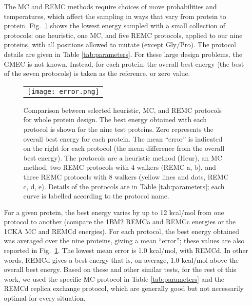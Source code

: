 {{The MC and REMC methods require choices of move probabilities and temperatures, which affect the sampling in ways
that vary from protein to protein. Fig.\ \ref{fig:protocols} shows the lowest energy sampled with a small
collection of protocols: one heuristic, one MC, and five REMC protocols, applied to our nine proteins, with all
positions allowed to mutate (except Gly/Pro). The protocol details are given in Table \ref{tab:parameters}. For
these large design problems, the GMEC is not known. Instead, for each protein, the overall best energy (the best
of the seven protocols) is taken as the reference, or zero value.


    \begin{figure}[!htbp]
      \centering
      \begin{tabular}{c}
        \texttt{[image: error.png]} 
      \end{tabular}
      \caption{\small 
Comparison between selected heuristic, MC, and REMC protocols for whole protein design.
The best energy obtained with each protocol is shown for the nine test proteins. Zero represents
the overall best energy for each protein. The mean ``error'' is indicated on the right for each protocol
(the mean difference from the overall best energy). The protocols are a heuristic method (Heur), an MC
method, two REMC protocols with 4 walkers (REMC a, b), and three REMC protocols with 8 walkers (yellow
lines and dots, REMC c, d, e). Details of the protocols are in Table \ref{tab:parameters}; each curve
is labelled according to the protocol name.
}
       \label{fig:protocols}
    \end{figure}




For a given protein, the best energy varies by
up to 12 kcal/mol from one protocol to another (compare the 1BM2 REMCa and REMCc energies or the 1CKA MC and REMCd
energies). For each protocol, the best energy obtained was averaged over the nine proteins, giving a mean ``error'';
these values are also reported in Fig.\ \ref{fig:protocols}. The lowest mean error is 1.0 kcal/mol, with REMCd. In
other words, REMCd gives a best energy that is, on average, 1.0 kcal/mol above the overall best energy. Based on
these and other similar tests, for the rest of this work, we used the specific MC protocol in Table \ref{tab:parameters}
and the REMCd replica exchange protocol, which are generally good but not necessarily optimal for every situation. 

}}
